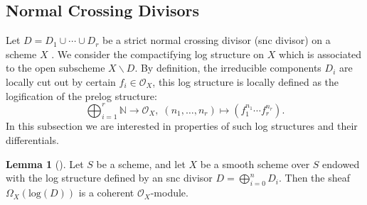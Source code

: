 \documentclass{amsart}
\theoremstyle{definition}
\newtheorem{lemma}[theorem]{Lemma}
\numberwithin{equation}{section}
\begin{document}
\subsection{Normal Crossing Divisors}
Let $D=D_1\cup \cdots \cup D_r$ be a strict normal crossing divisor (snc divisor) on a scheme $X$ \cite[Chapter III, Definition 1.8.1]{Ogus}. We consider the compactifying log structure on $X$ which is associated to the open subscheme $X\backslash D$. By definition, the irreducible components $D_i$ are locally cut out by certain $f_i\in \mathcal{O}_X$, this log structure is locally defined as the logification of the prelog structure:
\[
\bigoplus_{i=1}^r \mathbb{N}\to \mathcal{O}_X,\; (n_1,\dots ,n_r)\mapsto (f_1^{n_1} \cdots f_r^{n_r}).
\]
In this subsection we are interested in properties of such log structures and their differentials.
\begin{lemma}[{\cite[Chapter IV, Corollary 1.2.8]{Ogus}}]
	Let $S$ be a scheme, and let $X$ be a smooth scheme over $S$ endowed with the log structure defined by an snc divisor $D=\bigoplus_{i=0}^nD_i$. Then the sheaf $\Omega_{X}(\textrm{log}(D))$ is a coherent $\mathcal{O}_X$-module.
\end{lemma}
\end{document}
